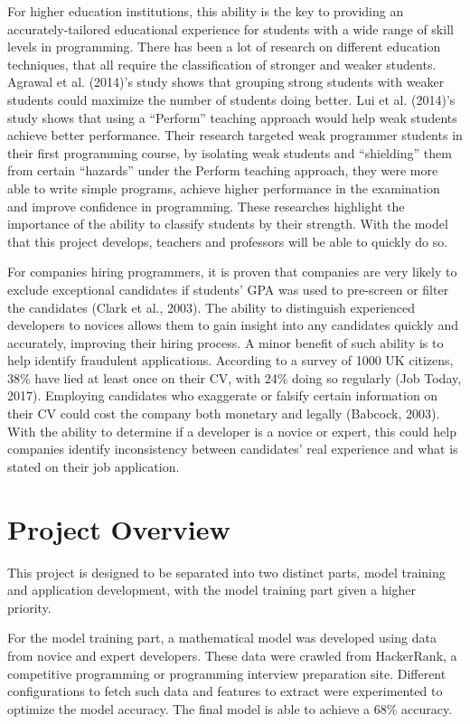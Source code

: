 \documentclass{report}
\begin{document}
For higher education institutions, this ability is the key to providing an accurately-tailored educational experience for students with a wide range of skill levels in programming. There has been a lot of research on different education techniques, that all require the classification of stronger and weaker students. Agrawal et al. (2014)’s study shows that grouping strong students with weaker students could maximize the number of students doing better. Lui et al. (2014)’s study shows that using a “Perform” teaching approach would help weak students achieve better performance. Their research targeted weak programmer students in their first programming course, by isolating weak students and “shielding” them from certain “hazards” under the Perform teaching approach, they were more able to write simple programs, achieve higher performance in the examination and improve confidence in programming. These researches highlight the importance of the ability to classify students by their strength. With the model that this project develops, teachers and professors will be able to quickly do so.

For companies hiring programmers, it is proven that companies are very likely to exclude exceptional candidates if students’ GPA was used to pre-screen or filter the candidates (Clark et al., 2003). The ability to distinguish experienced developers to novices allows them to gain insight into any candidates quickly and accurately, improving their hiring process. A minor benefit of such ability is to help identify fraudulent applications. According to a survey of 1000 UK citizens, 38\% have lied at least once on their CV, with 24\% doing so regularly (Job Today, 2017). Employing candidates who exaggerate or falsify certain information on their CV could cost the company both monetary and legally (Babcock, 2003). With the ability to determine if a developer is a novice or expert, this could help companies identify inconsistency between candidates’ real experience and what is stated on their job application.

\section{Project Overview}

This project is designed to be separated into two distinct parts, model training and application development, with the model training part given a higher priority.

For the model training part, a mathematical model was developed using data from novice and expert developers. These data were crawled from HackerRank, a competitive programming or programming interview preparation site. Different configurations to fetch such data and features to extract were experimented to optimize the model accuracy. The final model is able to achieve a 68\% accuracy.
\end{document}

